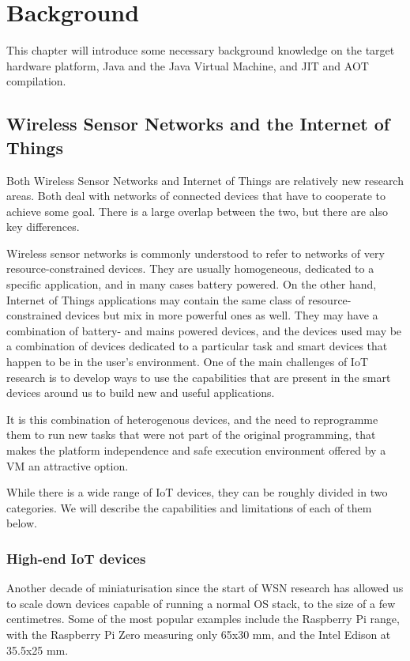\chapter{Background}
This chapter will introduce some necessary background knowledge on the target hardware platform, Java and the Java Virtual Machine, and JIT and AOT compilation.

\section{Wireless Sensor Networks and the Internet of Things}
Both Wireless Sensor Networks and Internet of Things are relatively new research areas. Both deal with networks of connected devices that have to cooperate to achieve some goal. There is a large overlap between the two, but there are also key differences.

Wireless sensor networks is commonly understood to refer to networks of very resource-constrained devices. They are usually homogeneous, dedicated to a specific application, and in many cases battery powered. On the other hand, Internet of Things applications may contain the same class of resource-constrained devices but mix in more powerful ones as well. They may have a combination of battery- and mains powered devices, and the devices used may be a combination of devices dedicated to a particular task and smart devices that happen to be in the user's environment. One of the main challenges of IoT research is to develop ways to use the capabilities that are present in the smart devices around us to build new and useful applications.

It is this combination of heterogenous devices, and the need to reprogramme them to run new tasks that were not part of the original programming, that makes the platform independence and safe execution environment offered by a VM an attractive option.

While there is a wide range of IoT devices, they can be roughly divided in two categories. We will describe the capabilities and limitations of each of them below. 


\subsection{High-end IoT devices}
Another decade of miniaturisation since the start of WSN research has allowed us to scale down devices capable of running a normal OS stack, to the size of a few centimetres. Some of the most popular examples include the Raspberry Pi range, with the Raspberry Pi Zero measuring only 65x30 mm, and the Intel Edison at 35.5x25 mm.

